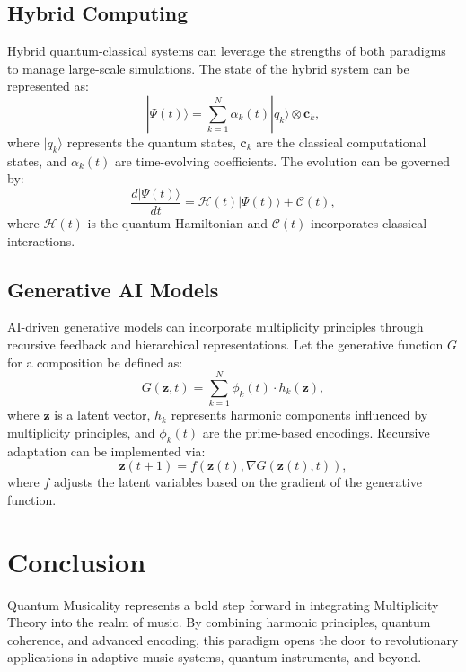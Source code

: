 \documentclass{article}
\theoremstyle{plain}
\begin{document}
\subsection{Hybrid Computing}
Hybrid quantum-classical systems can leverage the strengths of both paradigms to manage large-scale simulations. The state of the hybrid system can be represented as:
\[
| \Psi(t) \rangle = \sum_{k=1}^N \alpha_k(t) | q_k \rangle \otimes \mathbf{c}_k,
\]
where $| q_k \rangle$ represents the quantum states, $\mathbf{c}_k$ are the classical computational states, and $\alpha_k(t)$ are time-evolving coefficients. The evolution can be governed by:
\[
\frac{d | \Psi(t) \rangle}{dt} = \mathcal{H}(t) | \Psi(t) \rangle + \mathcal{C}(t),
\]
where $\mathcal{H}(t)$ is the quantum Hamiltonian and $\mathcal{C}(t)$ incorporates classical interactions.

\subsection{Generative AI Models}
AI-driven generative models can incorporate multiplicity principles through recursive feedback and hierarchical representations. Let the generative function $G$ for a composition be defined as:
\[
G(\mathbf{z}, t) = \sum_{k=1}^N \phi_k(t) \cdot h_k(\mathbf{z}),
\]
where $\mathbf{z}$ is a latent vector, $h_k$ represents harmonic components influenced by multiplicity principles, and $\phi_k(t)$ are the prime-based encodings. Recursive adaptation can be implemented via:
\[
\mathbf{z}(t+1) = f(\mathbf{z}(t), \nabla G(\mathbf{z}(t), t)),
\]
where $f$ adjusts the latent variables based on the gradient of the generative function.


\section{Conclusion}
Quantum Musicality represents a bold step forward in integrating Multiplicity Theory into the realm of music. By combining harmonic principles, quantum coherence, and advanced encoding, this paradigm opens the door to revolutionary applications in adaptive music systems, quantum instruments, and beyond.


\nocite{*}


\end{document}
